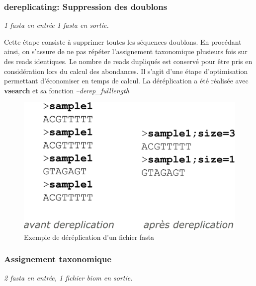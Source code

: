 \documentclass[12pt,a4paper]{article}
\begin{document}
\subsubsection{dereplicating: Suppression des doublons}\begin{center}\emph{1 fasta en entrée 1 fasta en sortie. } \end{center}

Cette étape consiste à supprimer toutes les séquences doublons. En procédant ainsi, on s'assure de ne pas répéter l'assignement taxonomique plusieurs fois sur des reads identiques. Le nombre de reads dupliqués est conservé pour être pris en considération lors du calcul des abondances. Il s'agit d'une étape d'optimisation permettant d'économiser en temps de calcul. La déréplication a été réalisée avec \textbf{vsearch} et sa fonction \textit{--derep\_fulllength }

\begin{figure}[ht]
\begin{center}
\includegraphics[scale=0.4]{img/dereplication.png}\hfill
\end{center}
\caption{Exemple de déréplication d'un fichier fasta}
\label{dereplication}
\end{figure}

\subsubsection{Assignement taxonomique} \begin{center}\emph{2 fasta en entrée,  1 fichier biom  en sortie. }\end{center} 
\end{document}
